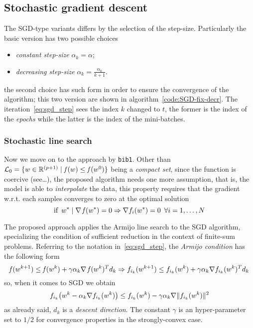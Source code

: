 \subsection{Stochastic gradient descent}

The SGD-type variants differs by the selection of the step-size. Particularly the basic version has two possible choices
\begin{itemize}
\item \emph{constant step-size} $\alpha_k=\alpha$;
\item \emph{decreasing step-size} $\alpha_k=\frac{\alpha_0}{k+1}$.
\end{itemize}
the second choice has such form in order to ensure the convergence of the algorithm; this two version are shown in algorithm~\vref{code:SGD-fix-decr}. The iteration~\eqref{eq:sgd_step} sees the index $k$ changed to $t$, the former is the index of the \emph{epochs} while the latter is the index of the mini-batches.

\subsubsection{Stochastic line search}

Now we move on to the approach by \texttt{bib1}. Other than $\mathcal{L}_0=\{w\in\mathbb{R}^{(p+1)}\mid\operatorname*{\mathit{f}}(w)\leq\operatorname*{\mathit{f}}(w^0)\}$ being a \emph{compact set}, since the function is coercive (see\dots), the proposed algorithm needs one more assumption, that is, the model is able to \emph{interpolate} the data, this property requires that the gradient w.r.t. each samples converges to zero at the optimal solution
\[
\text{if}\,\,\,w^\ast\mid\nabla\operatorname*{\mathit{f}}(w^\ast)=0\Rightarrow\nabla f_i(w^\ast)=0\,\,\,\forall i=1,\dots,N
\]

The proposed approach applies the Armijo line search to the SGD algorithm, specializing the condition of sufficient reduction in the context of finite-sum problems. Referring to the notation in~\eqref{eq:sgd_step}, the \emph{Armijo condition} has the following form
\[
\operatorname*{\mathit{f}}(w^{k+1})\leq\operatorname*{\mathit{f}}(w^k)+\gamma\alpha_k\nabla\operatorname*{\mathit{f}}(w^k)^Td_k\Rightarrow
f_{i_k}(w^{k+1})\leq f_{i_k}(w^k)+\gamma\alpha_k\nabla f_{i_k}(w^k)^Td_k
\]
so, when it comes to SGD we obtain
\begin{equation}\label{eq:armijo-sls}
f_{i_k}\bigl(w^k-\alpha_k\nabla f_{i_k}(w^k)\bigr)\leq f_{i_k}(w^k)-\gamma\alpha_k\nabla\lVert f_{i_k}(w^k)\rVert^2
\end{equation}
as already said, $d_k$ is a \emph{descent direction}. The constant $\gamma$ is an hyper-parameter set to $1/2$ for convergence properties in the strongly-convex case.

